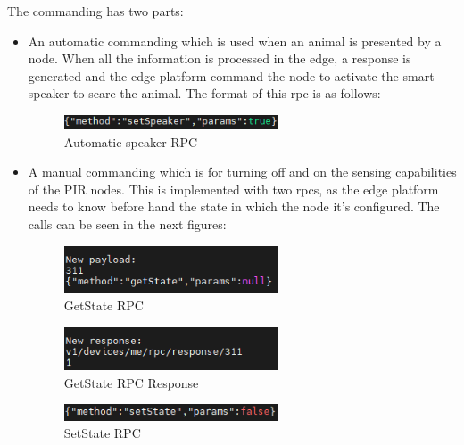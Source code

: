 The commanding has two parts:
\begin{itemize}
    \item An automatic commanding which is used when an animal is presented by a node. When all the information is processed in the edge, a response is 
    generated and the edge platform command the node to activate the smart speaker to scare the animal. The format of this \acrshort{rpc} is as follows:
    \begin{figure}[H]
        \centering
        \includegraphics[width=0.6\textwidth]{./images/8/speaker.png}
        \caption{Automatic speaker RPC}
        \label{fig:speakerRPC}
    \end{figure}
    \item A manual commanding which is for turning off and on the sensing capabilities of the PIR nodes. This is implemented with two \acrshort{rpc}s, as the edge 
    platform needs to know before hand the state in which the node it's configured. The calls can be seen in the next figures:

    \begin{figure}[H]
        \centering
        \includegraphics[width=0.6\textwidth]{./images/8/getStateRPC.png}
        \caption{GetState RPC}
        \label{fig:getStateRPC}
    \end{figure}

    \begin{figure}[H]
        \centering
        \includegraphics[width=0.6\textwidth]{./images/8/getStateRPCResponse.png}
        \caption{GetState RPC Response}
        \label{fig:getStateRPCResponse}
    \end{figure}

    \begin{figure}[H]
        \centering
        \includegraphics[width=0.6\textwidth]{./images/8/setState.png}
        \caption{SetState RPC}
        \label{fig:setStateRPC}
    \end{figure}

\end{itemize}